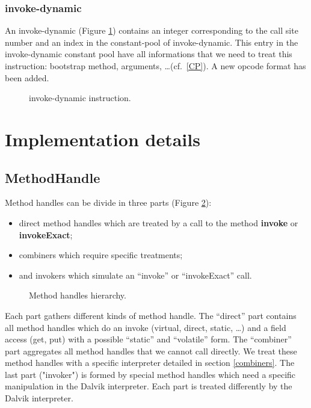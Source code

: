 \documentclass{sig-alternate}
\begin{document}
    \subsubsection{invoke-dynamic}

      An invoke-dynamic (Figure \ref{INDYins}) contains an integer corresponding to the call site number and an index in the constant-pool of invoke-dynamic.
      This entry in the invoke-dynamic constant pool have all informations that we need to treat this instruction: bootstrap method, arguments, \dots (cf.~\ref{CP}).
      A new opcode format has been added.

      \begin{figure}[!h]
        \centering \resizebox{.9\linewidth}{!}{}
        \caption{invoke-dynamic instruction.}\vspace{-1em}
        \label{INDYins}
      \end{figure}

\section{Implementation details}
\label{implD}

    \subsection{MethodHandle}
      Method handles can be divide in three parts (Figure \ref{mhHier}):
      \begin{itemize}
        \item direct method handles which are treated by a call to the method {\bf invoke} or {\bf invokeExact};
        \item combiners which require specific treatments;
        \item and invokers which simulate an ``invoke'' or ``invokeExact'' call.
      \end{itemize}

      \begin{figure}[!h]
        \centering \resizebox{\linewidth}{!}{}
        \caption{Method handles hierarchy.}
        \label{mhHier}
      \end{figure}

      Each part gathers different kinds of method handle.
      The ``direct'' part contains all method handles which do an invoke (virtual, direct, static, \dots)
      and a field access (get, put) with a possible ``static'' and ``volatile'' form.
      The ``combiner'' part aggregates all method handles that we cannot call directly.
      We treat these method handles with a specific interpreter detailed in section \ref{combiners}.
      The last part ("invoker") is formed by special method handles which need a specific manipulation in the Dalvik interpreter.
      Each part is treated differently by the Dalvik interpreter.
\end{document}

